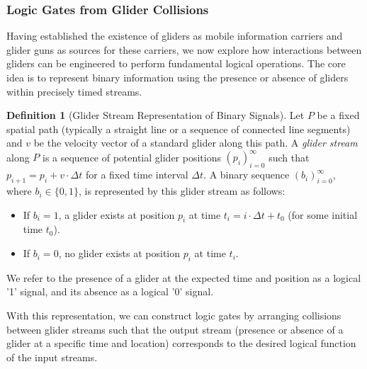 \documentclass{article}
\theoremstyle{definition}
\newtheorem{definition}{Definition}[section]
\theoremstyle{plain}
\theoremstyle{plain}
\begin{document}
\subsubsection{Logic Gates from Glider Collisions}

Having established the existence of gliders as mobile information carriers and glider guns as sources for these carriers, we now explore how interactions between gliders can be engineered to perform fundamental logical operations. The core idea is to represent binary information using the presence or absence of gliders within precisely timed streams.

\begin{definition}[Glider Stream Representation of Binary Signals]
Let $P$ be a fixed spatial path (typically a straight line or a sequence of connected line segments) and $v$ be the velocity vector of a standard glider along this path. A \textit{glider stream} along $P$ is a sequence of potential glider positions $(p_i)_{i=0}^{\infty}$ such that $p_{i+1} = p_i + v \cdot \Delta t$ for a fixed time interval $\Delta t$. A binary sequence $(b_i)_{i=0}^{\infty}$, where $b_i \in \{0, 1\}$, is represented by this glider stream as follows:
\begin{itemize}
  \item If $b_i = 1$, a glider exists at position $p_i$ at time $t_i = i \cdot \Delta t + t_0$ (for some initial time $t_0$).
  \item If $b_i = 0$, no glider exists at position $p_i$ at time $t_i$.
\end{itemize}
We refer to the presence of a glider at the expected time and position as a logical '1' signal, and its absence as a logical '0' signal.
\end{definition}

With this representation, we can construct logic gates by arranging collisions between glider streams such that the output stream (presence or absence of a glider at a specific time and location) corresponds to the desired logical function of the input streams.
\end{document}
